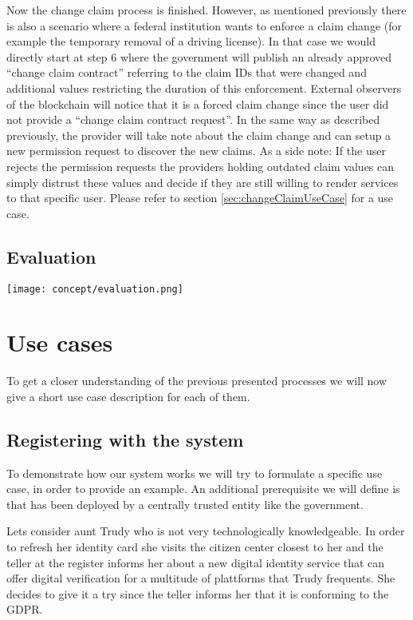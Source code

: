 Now the change claim process is finished. However, as mentioned previously there is also a scenario where a federal institution wants to enforce a claim change (for example the temporary removal of a driving license). In that case we would directly start at step 6 where the government will publish an already approved “change claim contract” referring to the claim IDs that were changed and additional values restricting the duration of this enforcement. External observers of the blockchain will notice that it is a forced claim change since the user did not provide a “change claim contract request”. In the same way as described previously, the provider will take note about the claim change and can setup a new permission request to discover the new claims. As a side note: If the user rejects the permission requests the providers holding outdated claim values can simply distrust these values and decide if they are still willing to render services to that specific user. Please refer to section \ref{sec:changeClaimUseCase} for a use case.

\subsection{Evaluation}

\texttt{[image: concept/evaluation.png]}
 
\section{Use cases}

To get a closer understanding of the previous presented processes we will now give a short use case description for each of them. 

\subsection{Registering with the system}
\label{ssec:registerWithSystem}
To demonstrate how our system works we will try to formulate a specific use case, in order to provide an example. An additional prerequisite we will define is that \projectName{} has been deployed by a centrally trusted entity like the government.

Lets consider aunt Trudy who is not very technologically knowledgeable. In order to refresh her identity card she visits the citizen center closest to her and the teller at the register informs her about a new digital identity service that can offer digital verification for a multitude of plattforms that Trudy frequents. She decides to give it a try since the teller informs her that it is conforming to the GDPR\cite{gdpr}.


